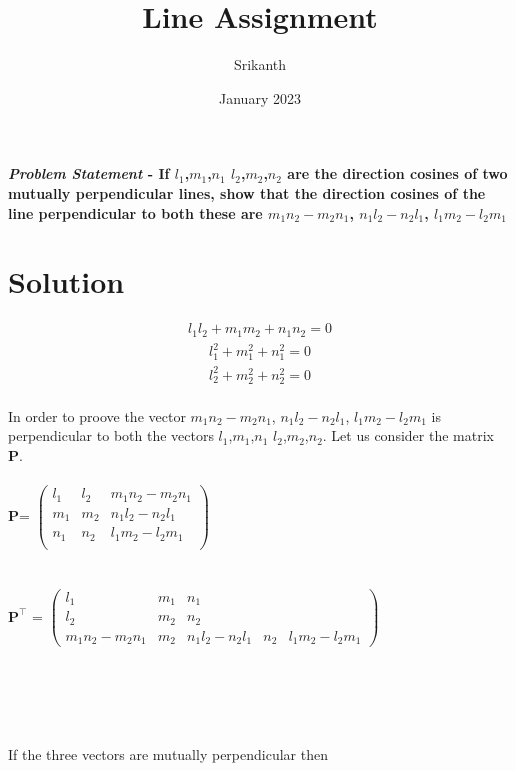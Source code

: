\documentclass[12pt]{article}
\title{\textbf{Line Assignment}}
\author{Srikanth}
\date{January 2023}
\begin{document}
\maketitle
\paragraph{\textit{Problem Statement} - If $l_1$,$m_1$,$n_1$  $l_2$,$m_2$,$n_2$ are the direction cosines of two mutually perpendicular lines, show that the direction cosines of the line perpendicular to both these are  $m_1n_2-m_2n_1$, $n_1l_2-n_2l_1$, $l_1m_2-l_2m_1$}
\section*{Solution}
\begin{align}
 l_1l_2+m_1m_2+n_1n_2=0\label{1}
 \end{align}
 \begin{align}
 l_1^2+m_1^2+n_1^2=0\label{2}
  \end{align}
  \begin{align}
  l_2^2+m_2^2+n_2^2=0\label{3}
  \end{align}
\\
In order to proove the vector  $m_1n_2-m_2n_1$, $n_1l_2-n_2l_1$, $l_1m_2-l_2m_1$ is perpendicular to both the vectors $l_1$,$m_1$,$n_1$  $l_2$,$m_2$,$n_2$. Let us consider the matrix \textbf{P}.
\\
\\
\textbf{P}=
	$\begin{pmatrix}
l_1&l_2&m_1n_2-m_2n_1\\
        m_1&m_2&n_1l_2-n_2l_1\\
        n_1&n_2&l_1m_2-l_2m_1\\
	\end{pmatrix}$
	\\
	\\	
	\\
	$\textbf{P}^{\top}$ =
	$\begin{pmatrix}
l_1&m_1&n_1\\
l_2&m_2&n_2\\
m_1n_2-m_2n_1&m_2&n_1l_2-n_2l_1&n_2&l_1m_2-l_2m_1
	\end{pmatrix}$ 
	\\
	\\
	\\
	\\
	\\
	\\
	If the three vectors are mutually perpendicular then
\end{document}

